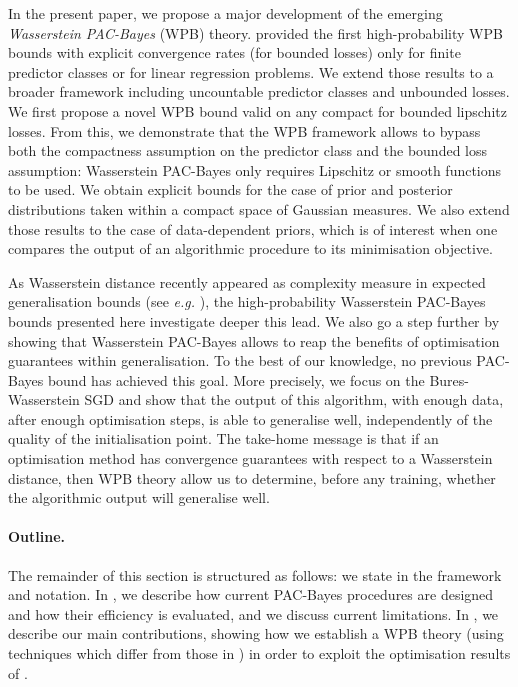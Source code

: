 In the present paper, we propose a major development of the emerging \emph{Wasserstein PAC-Bayes} (WPB) theory.
\citet{amit2022integral} provided the first high-probability WPB bounds with explicit convergence rates (for bounded losses) only for finite predictor classes or for linear regression problems. We extend those results to a broader framework including uncountable predictor classes and unbounded losses. We first propose a novel  WPB bound valid on any compact for bounded lipschitz losses. From this, we demonstrate that the WPB framework allows to bypass both the compactness assumption on the predictor class and the bounded loss assumption: Wasserstein PAC-Bayes only requires Lipschitz or smooth functions to be used. We obtain explicit bounds for the case of prior and posterior distributions taken within a compact space of Gaussian measures.
We also extend those results to the case of data-dependent priors, which is of interest when one compares the output of an algorithmic procedure to its minimisation objective.


As Wasserstein distance recently appeared as complexity measure in expected generalisation bounds (see \emph{e.g.} \citealp{rodriguez2021tighter}), the high-probability Wasserstein PAC-Bayes bounds presented here investigate deeper this lead. We also go a step further by showing that Wasserstein PAC-Bayes allows to reap the benefits of optimisation guarantees within generalisation. To the best of our knowledge, no previous PAC-Bayes bound has achieved this goal.
More precisely, we focus on the Bures-Wasserstein SGD \citep{altschuler2021aver,lambert2022variational} and show that the output of this algorithm, with enough data, after enough optimisation steps, is able to generalise well, independently of the quality of the initialisation point. The take-home message is that if an optimisation method has convergence guarantees with respect to a Wasserstein distance, then WPB theory allow us to determine, before any training, whether the algorithmic output will generalise well.

\paragraph{Outline.}
The remainder of this section is structured as follows: we state in  the framework and notation. In , we describe how current PAC-Bayes procedures are designed and how their efficiency is evaluated, and we discuss current limitations.
In , we describe our main contributions, showing how we establish a WPB theory (using techniques which differ from those in \citealp{amit2022integral}) in order to exploit the optimisation results of \citet{lambert2022variational}.

